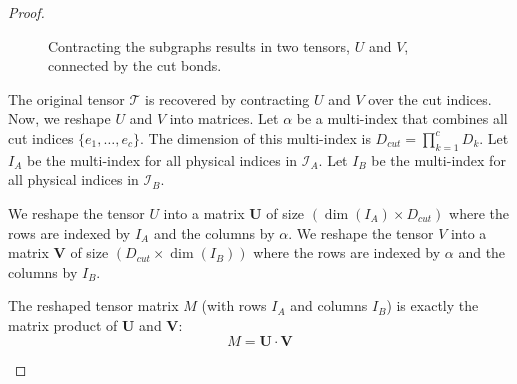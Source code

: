\documentclass[../../main.tex]{subfiles}
\begin{document}
\begin{proof}
\begin{figure}[h!]
\centering
{}
\caption{Contracting the subgraphs results in two tensors, $U$ and $V$, connected by the cut bonds.}
\end{figure}

The original tensor $\mathcal{T}$ is recovered by contracting $U$ and $V$ over the cut indices. Now, we reshape $U$ and $V$ into matrices. Let $\alpha$ be a multi-index that combines all cut indices $\{e_1, \dots, e_c\}$. The dimension of this multi-index is $D_{cut} = \prod_{k=1}^{c} D_k$.
Let $I_A$ be the multi-index for all physical indices in $\mathcal{I}_A$.
Let $I_B$ be the multi-index for all physical indices in $\mathcal{I}_B$.

We reshape the tensor $U$ into a matrix $\mathbf{U}$ of size $(\dim(I_A) \times D_{cut})$ where the rows are indexed by $I_A$ and the columns by $\alpha$.
We reshape the tensor $V$ into a matrix $\mathbf{V}$ of size $(D_{cut} \times \dim(I_B))$ where the rows are indexed by $\alpha$ and the columns by $I_B$.

The reshaped tensor matrix $M$ (with rows $I_A$ and columns $I_B$) is exactly the matrix product of $\mathbf{U}$ and $\mathbf{V}$:
$$ M = \mathbf{U} \cdot \mathbf{V} $$

\begin{figure}[h!]
\centering
{}
\end{figure}
\end{proof}
\end{document}

